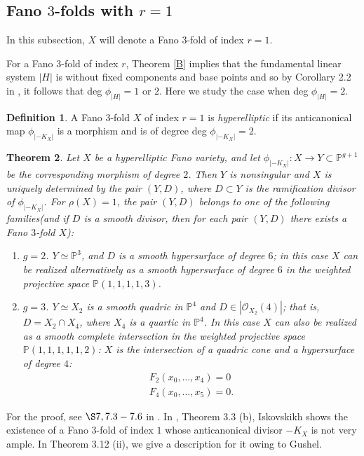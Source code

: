 \documentclass[11pt]{amsart}
\theoremstyle{plain}
\newtheorem{theorem}{Theorem}[section]
\theoremstyle{definition}
\newtheorem{definition}[theorem]{Definition}
\theoremstyle{expl}
\begin{document}
\subsection{Fano $3$-folds with $r=1$}
In this subsection, $X$ will denote a Fano $3$-fold of index $r=1$. 

For a Fano $3$-fold of index $r$, Theorem \ref{B} implies that the fundamental linear system $|H|$ is without fixed components and base points and so by Corollary 2.2 in \cite{Isk77}, it follows that deg $\phi_{|H|} =1$ or $2$. Here we study the case when deg $\phi_{|H|}=2$. 
\begin{definition}
    A Fano $3$-fold $X$ of index $r=1$ is \textit{hyperelliptic} if its anticanonical map $\phi_{|-K_X|}$ is a morphism and is of degree deg $\phi_{|-K_X|} = 2$.
\end{definition}
\begin{theorem}
    Let $X$ be a hyperelliptic Fano variety, and let $\phi_{|-K_X|} : X \to Y \subset \mathbb{P}^{g+1}$ be the corresponding morphism of degree $2$. Then $Y$ is nonsingular and $X$ is uniquely determined by the pair $(Y,D)$, where $D\subset Y$ is the ramification divisor of $\phi_{|-K_X|}$. For $\rho(X)=1$, 
    the pair $(Y,D)$ belongs to one of the following families(and if $D$ is a smooth divisor, then for each pair $(Y,D)$ there exists a Fano $3$-fold $X$):
    \begin{enumerate}
        \item[(i)]$g=2$. $Y \simeq \mathbb{P}^3$, and $D$ is a smooth hypersurface of degree $6$; in this case $X$ can be realized alternatively as a smooth hypersurface of degree $6$ in the weighted projective space $\mathbb{P}(1,1,1,1,3)$. 
        \item[(ii)]$g=3$. $Y \simeq X_2$ is a smooth quadric in $\mathbb{P}^4$ and $D \in |\mathcal{O}_{X_2}(4)|$; that is, $D = X_2 \cap X_4$, where $X_4$ is a quartic in $\mathbb{P}^4$. In this case $X$ can also be realized as a smooth complete intersection in the weighted projective space $\mathbb{P}(1,1,1,1,1,2)$: $X$ is the intersection of a quadric cone and a hypersurface of degree $4$:
        \begin{gather*}
        F_2(x_0,  \dots , x_4)=0 \\
        F_4(x_0, \dots , x_5)=0.
        \end{gather*}
    \end{enumerate}
\end{theorem}
For the proof, see $\S 7, 7.3-7.6$ in \cite{Isk77}.
\medbreak
In \cite{Isk77}, Theorem 3.3 (b), Iskovskikh shows the existence of a Fano $3$-fold of index $1$ whose anticanonical divisor $-K_X$ is not very ample. In Theorem 3.12 (ii), we give a description for it owing to Gushel.
\end{document}
